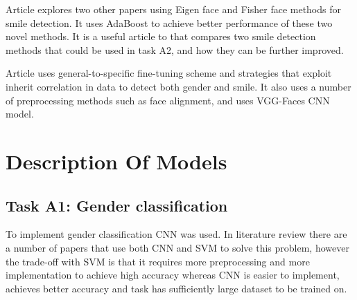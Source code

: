 \documentclass{article}
\begin{document}
Article \cite{8349659} explores two other papers using Eigen face and Fisher face methods for smile detection. It uses AdaBoost to achieve better performance of these two novel methods. It is a useful article to that compares two smile detection methods that could be used in task A2, and how they can be further improved. 

Article \cite{7789587} uses general-to-specific fine-tuning scheme and strategies that exploit inherit correlation in data to detect both gender and smile. It also uses a number of preprocessing methods such as face alignment, and uses VGG-Faces CNN model.

\section{Description Of Models}
\label{sec:models}

\subsection{Task A1: Gender classification}

To implement gender classification CNN was used. In literature review there are a number of papers that use both CNN and SVM to solve this problem, however the trade-off with SVM is that it requires more preprocessing and more implementation to achieve high accuracy whereas CNN is easier to implement, achieves better accuracy and task has sufficiently large dataset to be trained on. 
\end{document}
